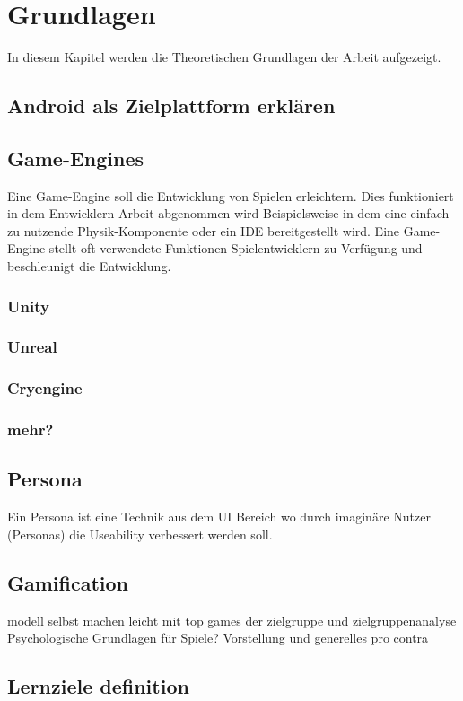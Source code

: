 \section{Grundlagen}
	In diesem Kapitel werden die Theoretischen Grundlagen der Arbeit aufgezeigt.
\subsection{Android als Zielplattform erklären}
\subsection{Game-Engines}
	Eine Game-Engine soll die Entwicklung von Spielen erleichtern. Dies funktioniert in dem Entwicklern Arbeit abgenommen wird Beispielsweise in dem eine einfach zu nutzende Physik-Komponente oder ein \gls{IDE} bereitgestellt wird. Eine Game-Engine stellt oft verwendete Funktionen Spielentwicklern zu Verfügung und beschleunigt die Entwicklung.
	\subsubsection{Unity}
	\subsubsection{Unreal}
	\subsubsection{Cryengine}
	\subsubsection{mehr?}
\subsection{Persona}\label{ssec:persona}
	Ein Persona ist eine Technik aus dem UI Bereich wo durch imaginäre Nutzer (Personas) die Useability verbessert werden soll.
\subsection{Gamification}
	modell selbst machen leicht mit top games der zielgruppe und zielgruppenanalyse
	Psychologische Grundlagen für Spiele?
	Vorstellung und generelles pro contra
\subsection{Lernziele definition}

